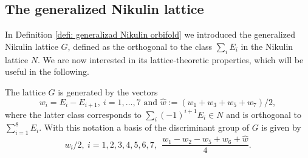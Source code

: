 \documentclass{amsart}
\theoremstyle{definition}
\numberwithin{equation}{section}
\numberwithin{equation}{section} \theoremstyle{definition}
\begin{document}
\subsection{The generalized Nikulin lattice}
In Definition \ref{defi: generalizad Nikulin orbifold} we introduced the generalized Nikulin lattice $G$, defined as the orthogonal to the class $\sum_iE_i$ in the Nikulin lattice $N$. We are now interested in its lattice-theoretic properties, which will be useful in the following. 

The lattice $G$ is generated by the vectors $$w_i=E_i-E_{i+1},\ i=1,\ldots, 7\mbox{ and }\hat{w}:=(w_1+w_3+w_5+w_7)/2,$$ where the latter class corresponds to $\sum_i{(-1)}^{i+1}E_i\in N$  and is orthogonal to $\sum_{i=1}^8E_i$. With this notation a basis of the discriminant group of $G$ is given by 
\begin{equation}\label{disc G}
w_i/2,\ i=1,2,3,4,5,6,7,\ \ \frac{w_1-w_2-w_5+w_6+\hat{w}}{4}.
\end{equation}
\end{document}
